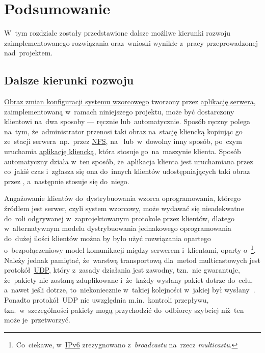 \documentclass[thesis]{subfiles}
\begin{document}
\chapter{Podsumowanie}

W~tym rozdziale zostały przedstawione dalsze możliwe kierunki rozwoju zaimplementowanego rozwiązania oraz~wnioski wynikłe z~pracy przeprowadzonej nad~projektem.

\section{Dalsze kierunki rozwoju}

\hyperref[sec:obraz-zmian-konfiguracji]{Obraz zmian konfiguracji systemu wzorcowego} tworzony przez \hyperref[sec:srv-app]{aplikację serwera}, zaimplementowaną w~ramach niniejszego projektu, może być dostarczony klientowi na~dwa sposoby --- ręcznie lub~automatycznie. Sposób ręczny polega na~tym, że~administrator przenosi taki obraz na~stację kliencką kopiując go ze~stacji serwera~np.~przez \href{https://en.wikipedia.org/wiki/Network_File_System}{NFS}, na~ lub~w~dowolny inny sposób, po~czym uruchamia \hyperref[sec:cli-app]{aplikację kliencką}, która stosuje go~na~maszynie klienta. Sposób automatyczny działa w~ten sposób, że~aplikacja klienta jest uruchamiana przez  co~jakiś czas i~zgłasza się ona do~innych klientów udostępniających taki obraz przez \sftp{}, a~następnie stosuje się do~niego.

Angażowanie klientów do~dystrybuowania wzorca oprogramowania, którego źródłem jest serwer, czyli system wzorcowy, może wydawać się nieadekwatne do~roli odgrywanej w~zaprojektowanym protokole przez klientów, dlatego w~alternatywnym modelu dystrybuowania jednakowego oprogramowania do~dużej ilości klientów można by było użyć rozwiązania opartego o~bezpołączeniowy model komunikacji między serwerem i~klientami, oparty o~\footnote{Co~ciekawe, w~\href{https://en.wikipedia.org/wiki/IPv6}{IPv6} zrezygnowano z~\emph{broadcastu} na~rzecz \emph{multicastu}.}. Należy jednak pamiętać, że~warstwą transportową dla~metod multicastowych jest protokół~\href{https://en.wikipedia.org/wiki/User_Datagram_Protocol}{UDP}, który z~zasady działania jest zawodny, tzn.~nie gwarantuje, że~pakiety nie zostaną zduplikowane i~że~każdy wysłany pakiet dotrze do~celu, a~nawet jeśli dotrze, to~niekoniecznie w~takiej kolejności w~jakiej był wysłany~\cite{rfc1112}. Ponadto protokół~UDP nie uwzględnia m.in.~kontroli przepływu, tzn.~w~szczególności pakiety mogą przychodzić do~odbiorcy szybciej niż~ten może je~przetworzyć.
\end{document}
